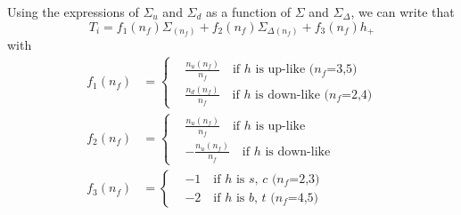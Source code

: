 \documentclass[a4paper,oneside]{article}
\begin{document}
Using the expressions of $\Sigma_u$ and $\Sigma_d$ as a function of $\Sigma$ and $\Sigma_\Delta$, we can write that
\begin{equation*}
T_i = f_1(n_f) \Sigma_{(n_f)} + f_2(n_f)\Sigma_{\Delta(n_f)} + f_3(n_f)h_+
\end{equation*}
with
\begin{align*}
f_1(n_f) &=
\begin{cases}
&\frac{n_u(n_f)}{n_f} \quad \text{if $h$ is up-like ($n_f$=3,5)} \\
&\frac{n_d(n_f)}{n_f} \quad \text{if $h$ is down-like ($n_f$=2,4)}
\end{cases} \\
f_2(n_f) &=
\begin{cases}
&\frac{n_u(n_f)}{n_f} \quad \text{if $h$ is up-like} \\
&-\frac{n_u(n_f)}{n_f} \quad \text{if $h$ is down-like}
\end{cases} \\
f_3(n_f) &=
\begin{cases}
&-1\quad \text{if $h$ is $s$, $c$  ($n_f$=2,3)} \\
&-2 \quad \text{if $h$ is $b$, $t$  ($n_f$=4,5)}
\end{cases}
\end{align*}
\end{document}
